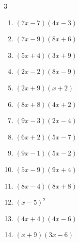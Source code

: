 \begin{multicols}{3}
\begin{enumerate}

  \item $(7x-7)(4x-3)$


  \item $(7x-9)(8x+6)$


  \item $(5x+4)(3x+9)$


\columnbreak %

  \item $(2x-2)(8x-9)$


  \item $(2x+9)(x+2)$


  \item $(8x+8)(4x+2)$


  \item $(9x-3)(2x-4)$


  \item $(6x+2)(5x-7)$


  \item $(9x-1)(5x-2)$


  \item $(5x-9)(9x+4)$


  \item $(8x-4)(8x+8)$


  \item $(x-5)^{2}$


  \item $(4x+4)(4x-6)$


  \item $(x+9)(3x-6)$



\end{enumerate}
\end{multicols}

